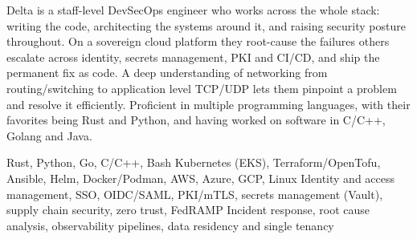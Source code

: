 \documentclass{resume}
\begin{document}

Delta is a staff-level DevSecOps engineer who works across the whole stack:
writing the code, architecting the systems around it, and raising security
posture throughout. On a sovereign cloud platform they root-cause the failures
others escalate across identity, secrets management, PKI and CI/CD, and ship
the permanent fix as code. A deep understanding of networking from
routing/switching to application level TCP/UDP lets them pinpoint a problem and
resolve it efficiently. Proficient in multiple programming languages, with
their favorites being Rust and Python, and having worked on software in
C/C++, Golang and Java.

 Rust, Python, Go, C/C++, Bash
 Kubernetes (EKS), Terraform/OpenTofu, Ansible, Helm,
Docker/Podman, AWS, Azure, GCP, Linux
 Identity and access management, SSO, OIDC/SAML, PKI/mTLS,
secrets management (Vault), supply chain security, zero trust, FedRAMP
 Incident response, root cause analysis, observability
pipelines, data residency and single tenancy

\end{document}
